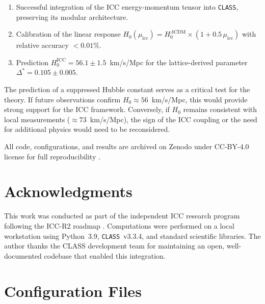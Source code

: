 \documentclass[11pt,a4paper]{article}
\newcommand{\lcdm}{\Lambda\mathrm{CDM}}
\newcommand{\DeltaStar}{\Delta^{\ast}}
\newcommand{\muicc}{\mu_{\mathrm{icc}}}
\newcommand{\class}{\texttt{CLASS}}
\begin{document}
\begin{enumerate}[label=\arabic*.]
    \item Successful integration of the ICC energy-momentum tensor into \class{}, preserving its modular architecture.
    \item Calibration of the linear response $H_0(\muicc) = H_0^{\lcdm} \times (1 + 0.5\,\muicc)$ with relative accuracy $< 0.01\%$.
    \item Prediction $H_0^{\mathrm{ICC}} = 56.1 \pm 1.5$~km/s/Mpc for the lattice-derived parameter $\DeltaStar = 0.105 \pm 0.005$.
\end{enumerate}

The prediction of a suppressed Hubble constant serves as a critical test for the theory. If future observations confirm $H_0 \approx 56$~km/s/Mpc, this would provide strong support for the ICC framework. Conversely, if $H_0$ remains consistent with local measurements ($\approx 73$~km/s/Mpc), the sign of the ICC coupling or the need for additional physics would need to be reconsidered.

All code, configurations, and results are archived on Zenodo under CC-BY-4.0 license for full reproducibility \cite{gimranov2026roadmap}.

\section*{Acknowledgments}
\noindent
This work was conducted as part of the independent ICC research program following the ICC-R2 roadmap \cite{gimranov2026roadmap}. Computations were performed on a local workstation using Python~3.9, \class{}~v3.3.4, and standard scientific libraries. The author thanks the CLASS development team for maintaining an open, well-documented codebase that enabled this integration.




\appendix
\section{Configuration Files}
\label{app:configs}
\end{document}
